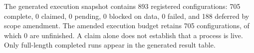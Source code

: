 The generated execution snapshot contains 893 registered configurations: 705 complete, 0 claimed, 0 pending, 0 blocked on data, 0 failed, and 188 deferred by scope amendment. The amended execution budget retains 705 configurations, of which 0 are unfinished. A claim alone does not establish that a process is live. Only full-length completed runs appear in the generated result table.\par
